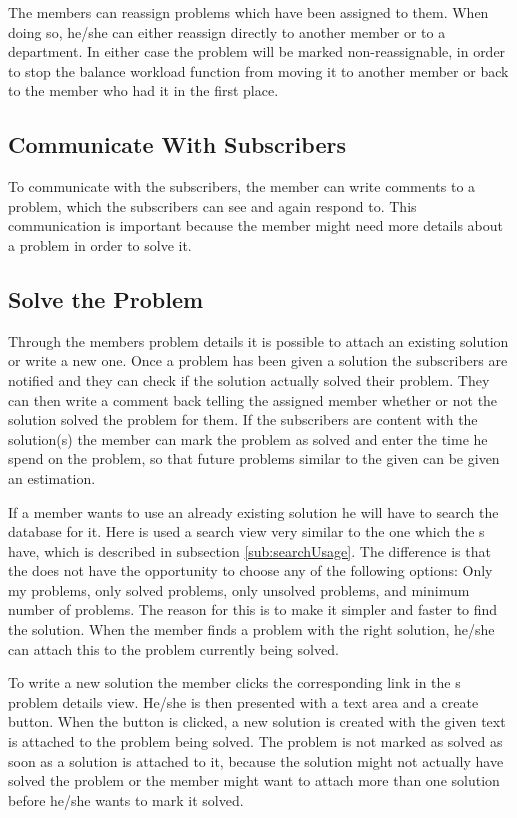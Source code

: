 The \astaff[] members can reassign problems which have been assigned to them.
When doing so, he/she can either reassign directly to another \astaff[] member or to a department.
In either case the problem will be marked non-reassignable, in order to stop the balance workload function from moving it to another \astaff[] member or back to the \astaff[] member who had it in the first place.

\subsection{Communicate With Subscribers}
To communicate with the subscribers, the \astaff[] member can write comments to a problem, which the subscribers can see and again respond to.
This communication is important because the \astaff[] member might need more details about a problem in order to solve it.

\subsection{Solve the Problem}
Through the \staff[] members problem details it is possible to attach an existing solution or write a new one.
Once a problem has been given a solution the subscribers are notified and they can check if the solution actually solved their problem.
They can then write a comment back telling the assigned \astaff[] member whether or not the solution solved the problem for them.
If the subscribers are content with the solution(s) the \astaff[] member can mark the problem as solved and enter the time he spend on the problem, so that future problems similar to the given can be given an estimation.

If a \astaff[] member wants to use an already existing solution he will have to search the database for it.
Here is used a search view very similar to the one which the \aclient[]s have, which is described in subsection \ref{sub:searchUsage}.
The difference is that the \astaff[] does not have the opportunity to choose any of the following options: Only my problems, only solved problems, only unsolved problems, and minimum number of problems.
The reason for this is to make it simpler and faster to find the solution.
When the \astaff[] member finds a problem with the right solution, he/she can attach this to the problem currently being solved.

To write a new solution the \astaff[] member clicks the corresponding link in the \astaff[]s problem details view.
He/she is then presented with a text area and a create button.
When the button is clicked, a new solution is created with the given text is attached to the problem being solved.
The problem is not marked as solved as soon as a solution is attached to it, because the solution might not actually have solved the problem or the \astaff[] member might want to attach more than one solution before he/she wants to mark it solved.
